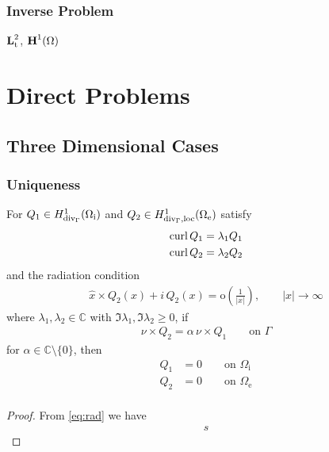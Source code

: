 \subsection{Inverse Problem}

$\textbf{\text{L}}_\text{t}^2$, $\textbf{\text{H}}^1(\Omega)$

\chapter{Direct Problems} 

\section{Three Dimensional Cases}

\subsection{Uniqueness}

\begin{lmm}
  For $Q_1\in H_{\operatorname{div}_\Gamma}^1(\Omega_\text{i})$ and $Q_2\in H_{\operatorname{div}_\Gamma,\text{loc}}^1(\Omega_\text{e})$ satisfy
  \begin{align*}
    \operatorname{curl} Q_1 &= \lambda_1 Q_1 \\
    \operatorname{curl} Q_2 &= \lambda_2 Q_2 \\
  \end{align*}
and the radiation condition
  \begin{align*}
    \hat{x}\times Q_2(x) + i\,Q_2(x) = \text{o}\left(\frac{1}{|x|}\right),\qquad|x|\to\infty
  \end{align*}
where $\lambda_1, \lambda_2\in\mathbb{C}$ with $\Im{\lambda_1},\Im{\lambda_2}\geqslant 0$, if 
\begin{align}\label{eq:rad}
    \nu\times Q_2 = \alpha\,\nu\times Q_1\qquad\text{on }\Gamma
  \end{align}
  for $\alpha\in\mathbb{C}\setminus\{0\}$, then
\begin{align*}
  Q_1 &= 0\qquad\text{on }\Omega_\text{i} \\
  Q_2 &= 0\qquad\text{on }\Omega_\text{e} \\
\end{align*}
\end{lmm}

\begin{proof}
  From \eqref{eq:rad} we have
  \begin{align*}
    s
  \end{align*}
\end{proof}

